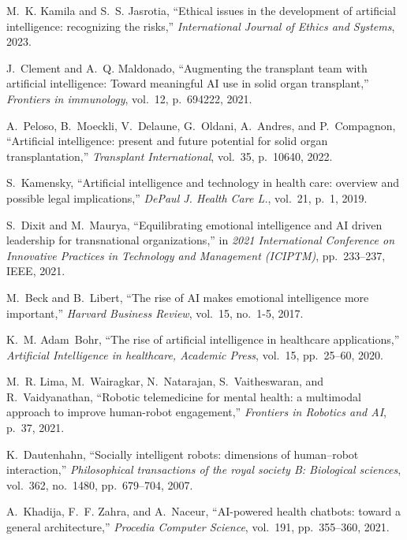 \documentclass{article}
\begin{document}
\begin{thebibliography}{100}
	M.~K. Kamila and S.~S. Jasrotia, ``Ethical issues in the development of
	artificial intelligence: recognizing the risks,'' {\em International Journal
		of Ethics and Systems}, 2023.
	
	J.~Clement and A.~Q. Maldonado, ``Augmenting the transplant team with
	artificial intelligence: Toward meaningful {AI} use in solid organ
	transplant,'' {\em Frontiers in immunology}, vol.~12, p.~694222, 2021.
	
	A.~Peloso, B.~Moeckli, V.~Delaune, G.~Oldani, A.~Andres, and P.~Compagnon,
	``Artificial intelligence: present and future potential for solid organ
	transplantation,'' {\em Transplant International}, vol.~35, p.~10640, 2022.
	
	S.~Kamensky, ``Artificial intelligence and technology in health care: overview
	and possible legal implications,'' {\em DePaul J. Health Care L.}, vol.~21,
	p.~1, 2019.
	
	S.~Dixit and M.~Maurya, ``Equilibrating emotional intelligence and {AI} driven
	leadership for transnational organizations,'' in {\em 2021 International
		Conference on Innovative Practices in Technology and Management (ICIPTM)},
	pp.~233--237, IEEE, 2021.
	
	M.~Beck and B.~Libert, ``The rise of {AI} makes emotional intelligence more
	important,'' {\em Harvard Business Review}, vol.~15, no.~1-5, 2017.
	
	K.~M. Adam~Bohr, ``The rise of artificial intelligence in healthcare
	applications,'' {\em Artificial Intelligence in healthcare, Academic Press},
	vol.~15, pp.~25--60, 2020.
	
	M.~R. Lima, M.~Wairagkar, N.~Natarajan, S.~Vaitheswaran, and R.~Vaidyanathan,
	``Robotic telemedicine for mental health: a multimodal approach to improve
	human-robot engagement,'' {\em Frontiers in Robotics and AI}, p.~37, 2021.
	
	K.~Dautenhahn, ``Socially intelligent robots: dimensions of human--robot
	interaction,'' {\em Philosophical transactions of the royal society B:
		Biological sciences}, vol.~362, no.~1480, pp.~679--704, 2007.
	
	A.~Khadija, F.~F. Zahra, and A.~Naceur, ``{AI}-powered health chatbots: toward
	a general architecture,'' {\em Procedia Computer Science}, vol.~191,
	pp.~355--360, 2021.
	

\end{thebibliography}
\end{document}
